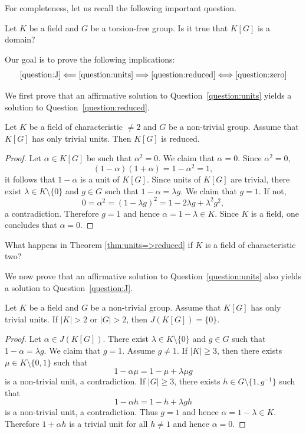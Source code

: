 For completeness, let us 
recall the following important question. 

\begin{question}
    \label{question:zero}
 	Let $K$ be a field and 
  $G$ be a torsion-free group. Is it true that 
 	$K[G]$ is a domain?
\end{question}

Our goal is to prove
the following implications:
\[
\ref{question:J}\Longleftarrow\ref{question:units}
\Longrightarrow\ref{question:reduced}
\Longleftrightarrow\ref{question:zero}
\]

We first prove that an affirmative solution to Question~\ref{question:units} 
yields a solution to Question~\ref{question:reduced}. 

\begin{theorem}
\label{thm:units=>reduced}
    Let $K$ be a field of characteristic $\ne2$ 
	and $G$ be a non-trivial group. Assume that $K[G]$ has only trivial units.
	Then $K[G]$ is reduced. 
\end{theorem}

\begin{proof}
	Let $\alpha\in K[G]$ be such that $\alpha^2=0$. We claim that 
	$\alpha=0$. Since $\alpha^2=0$, 
	\[
		(1-\alpha)(1+\alpha)=1-\alpha^2=1, 
	\]
	it follows that $1-\alpha$ is a unit of $K[G]$. Since units of $K[G]$ are 
	trivial, there exist $\lambda\in K\setminus\{0\}$ and $g\in G$ such that 
	$1-\alpha=\lambda g$. We claim that $g=1$. If not, 
	\[
		0=\alpha^2=(1-\lambda g)^2=1-2\lambda g+\lambda^2g^2,
	\]
	a contradiction. Therefore $g=1$ and hence $\alpha=1-\lambda\in K$. Since
	$K$ is a field, one concludes that $\alpha=0$.
\end{proof}

\begin{exercise}
    What happens in Theorem \ref{thm:units=>reduced} if $K$ is a field of characteristic two?
\end{exercise}

We now prove that an affirmative solution to Question~\ref{question:units} 
also yields a solution to Question~\ref{question:J}. 

\begin{theorem}
	Let $K$ be a field and $G$ be a non-trivial group. Assume that $K[G]$ has only trivial units. 
	If $|K|>2$ or $|G|>2$, then $J(K[G])=\{0\}$.
\end{theorem}

\begin{proof}
	Let $\alpha\in J(K[G])$. There exist $\lambda\in K\setminus\{0\}$ and $g\in
	G$ such that $1-\alpha=\lambda g$. We claim that $g=1$. Assume $g\ne 1$. 
	If $|K|\geq3$,
	then there exists $\mu\in K\setminus\{0,1\}$ such that
	\[
		1-\alpha\mu=1-\mu+\lambda\mu g 
	\]
	is a non-trivial unit, a contradiction.
	If $|G|\geq3$, there exists $h\in G\setminus\{1,g^{-1}\}$ such that
	\[
        1-\alpha h=1-h+\lambda gh
    \]
    is a non-trivial unit, a contradiction.  Thus
	$g=1$ and hence $\alpha=1-\lambda\in K$. Therefore $1+\alpha h$ is a
	trivial unit for all $h\ne 1$ and hence 	$\alpha=0$.
\end{proof}

